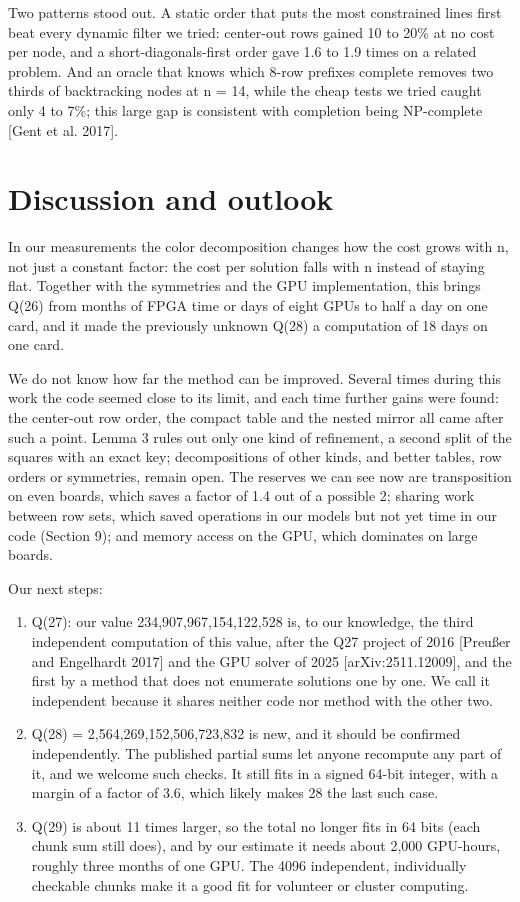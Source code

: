Two patterns stood out. A static order that puts the most constrained lines first beat every dynamic filter we tried: center-out rows gained 10 to 20\% at no cost per node, and a short-diagonals-first order gave 1.6 to 1.9 times on a related problem. And an oracle that knows which 8-row prefixes complete removes two thirds of backtracking nodes at n = 14, while the cheap tests we tried caught only 4 to 7\%; this large gap is consistent with completion being NP-complete [Gent et al. 2017].

\section{Discussion and outlook}

In our measurements the color decomposition changes how the cost grows with n, not just a constant factor: the cost per solution falls with n instead of staying flat. Together with the symmetries and the GPU implementation, this brings Q(26) from months of FPGA time or days of eight GPUs to half a day on one card, and it made the previously unknown Q(28) a computation of 18 days on one card.

We do not know how far the method can be improved. Several times during this work the code seemed close to its limit, and each time further gains were found: the center-out row order, the compact table and the nested mirror all came after such a point. Lemma 3 rules out only one kind of refinement, a second split of the squares with an exact key; decompositions of other kinds, and better tables, row orders or symmetries, remain open. The reserves we can see now are transposition on even boards, which saves a factor of 1.4 out of a possible 2; sharing work between row sets, which saved operations in our models but not yet time in our code (Section 9); and memory access on the GPU, which dominates on large boards.

Our next steps:

\begin{enumerate}
\item{} Q(27): our value 234,907,967,154,122,528 is, to our knowledge, the third independent computation of this value, after the Q27 project of 2016 [Preußer and Engelhardt 2017] and the GPU solver of 2025 [arXiv:2511.12009], and the first by a method that does not enumerate solutions one by one. We call it independent because it shares neither code nor method with the other two.
\item{} Q(28) = 2,564,269,152,506,723,832 is new, and it should be confirmed independently. The published partial sums let anyone recompute any part of it, and we welcome such checks. It still fits in a signed 64-bit integer, with a margin of a factor of 3.6, which likely makes 28 the last such case.
\item{} Q(29) is about 11 times larger, so the total no longer fits in 64 bits (each chunk sum still does), and by our estimate it needs about 2,000 GPU-hours, roughly three months of one GPU. The 4096 independent, individually checkable chunks make it a good fit for volunteer or cluster computing.
\end{enumerate}


